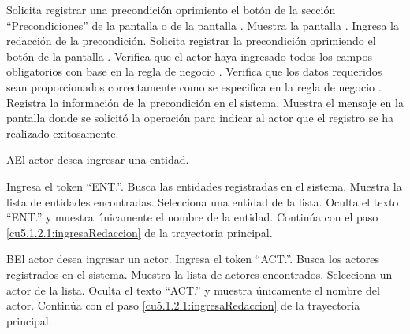  \begin{UCtrayectoria}
	\UCpaso[\UCactor] Solicita registrar una precondición oprimiento el botón \btnAgregar de la sección ``Precondiciones'' de la pantalla  o de la pantalla . 
	\UCpaso[\UCsist] Muestra la pantalla . 
	\UCpaso[\UCactor] Ingresa la redacción de la precondición.         \label{cu5.1.2.1:ingresaRedaccion}
	\UCpaso[\UCactor] Solicita registrar la precondición oprimiendo el botón  de la pantalla .  
	\UCpaso[\UCsist] Verifica que el actor haya ingresado todos los campos obligatorios con base en la regla de negocio . 
	\UCpaso[\UCsist] Verifica que los datos requeridos sean proporcionados correctamente como se especifica en la regla de negocio .  
	\UCpaso[\UCsist] Registra la información de la precondición en el sistema.
	\UCpaso[\UCsist] Muestra el mensaje  en la pantalla donde se solicitó la operación
	para indicar al actor que el registro se ha realizado exitosamente. 
\end{UCtrayectoria}

    

 \begin{UCtrayectoriaA}{A}{El actor desea ingresar una entidad.}
 	
 	 \UCpaso[\UCactor] Ingresa el token ``ENT.''.
 	\UCpaso[\UCsist] Busca las entidades registradas en el sistema. 
 	\UCpaso[\UCsist] Muestra la lista de entidades encontradas.
 	\UCpaso[\UCactor] Selecciona una entidad de la lista.
  	\UCpaso[\UCsist] Oculta el texto ``ENT.'' y muestra únicamente el nombre de la entidad.
    \UCpaso[] Continúa con el paso \ref{cu5.1.2.1:ingresaRedaccion} de la trayectoria principal.
 \end{UCtrayectoriaA}
 
 \begin{UCtrayectoriaA}{B}{El actor desea ingresar un actor.}
 	\UCpaso[\UCactor] Ingresa el token ``ACT.''.
 	\UCpaso[\UCsist] Busca los actores registrados en el sistema. 
 	\UCpaso[\UCsist] Muestra la lista de actores encontrados.
 	\UCpaso[\UCactor] Selecciona un actor de la lista.
  	\UCpaso[\UCsist] Oculta el texto ``ACT.'' y muestra únicamente el nombre del actor.
    \UCpaso[] Continúa con el paso \ref{cu5.1.2.1:ingresaRedaccion} de la trayectoria principal.
 \end{UCtrayectoriaA}

